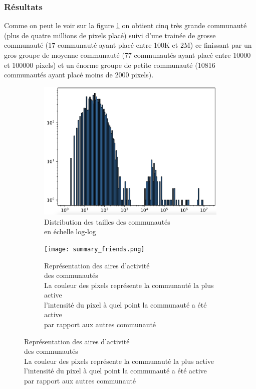 \documentclass[a4paper]{article}
\begin{document}
{\subsubsection{Résultats}
Comme on peut le voir sur la figure \ref{fig:communities_sizes_friends} on obtient cinq très grande communauté (plus de quatre millions de pixels placé) suivi d'une trainée de grosse communauté (17 communauté ayant placé entre 100K et 2M) ce finissant par un gros groupe de moyenne communauté (77 communautés ayant placé entre 10000 et 100000 pixels) et un énorme groupe de petite communauté (10816 communautés ayant placé moins de 2000 pixels). 
\begin{figure}[h]
    \captionsetup[subfigure]{justification=centering}
    \begin{subfigure}{.45\linewidth}
        \includegraphics[width=\linewidth]{communities_sizes_friends.png}
        \caption{Distribution des tailles des communautés \\en échelle log-log}
        \label{fig:communities_sizes_friends}
    \end{subfigure}
    \begin{subfigure}{.55\linewidth}
        \texttt{[image: summary\_friends.png]}
        \caption{Représentation des aires d'activité\\ des communautés\\ \tiny La couleur des pixels représente la communauté la plus active \\l'intensité du pixel à quel point la communauté a été active \\ par rapport aux autres communauté}
        \label{fig:summary_friends}
    \end{subfigure}
\end{figure}

}
\end{document}
